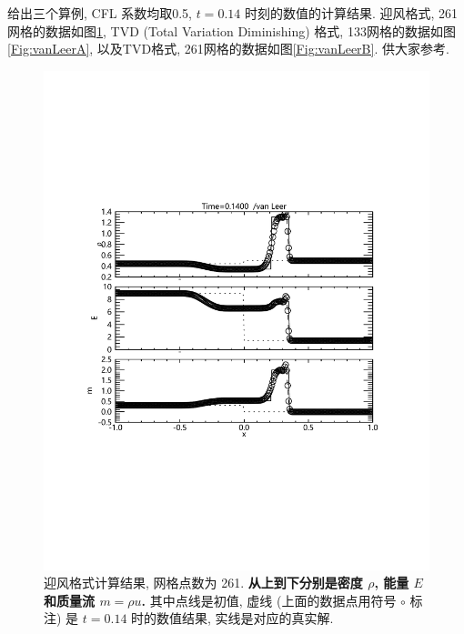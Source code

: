 \documentclass[10.5pt
]{article}
\begin{document}
给出三个算例, CFL 系数均取0.5, $t=0.14$ 时刻的数值的计算结果. 迎风格式, 261网格的数据如图\ref{Fig:Upwind}, TVD (Total Variation Diminishing) 格式\citep{vanLeer1974,Harten1983}, 133网格的数据如图\ref{Fig:vanLeerA}, 以及TVD格式, 261网格的数据如图\ref{Fig:vanLeerB}. 供大家参考.

\begin{figure}
\begin{center}
\includegraphics[width=.85\textwidth]{fig_tvd.pdf}
\caption{迎风格式计算结果, 网格点数为 261. \textbf{从上到下分别是密度 $\rho$, 能量 $E$ 和质量流 $m = \rho u$.}
其中点线是初值, 虚线 (上面的数据点用符号 $\circ$ 标注) 是 $t=0.14$ 时的数值结果, 实线是对应的真实解.}\label{Fig:Upwind}
\end{center}
\end{figure}
\end{document}
